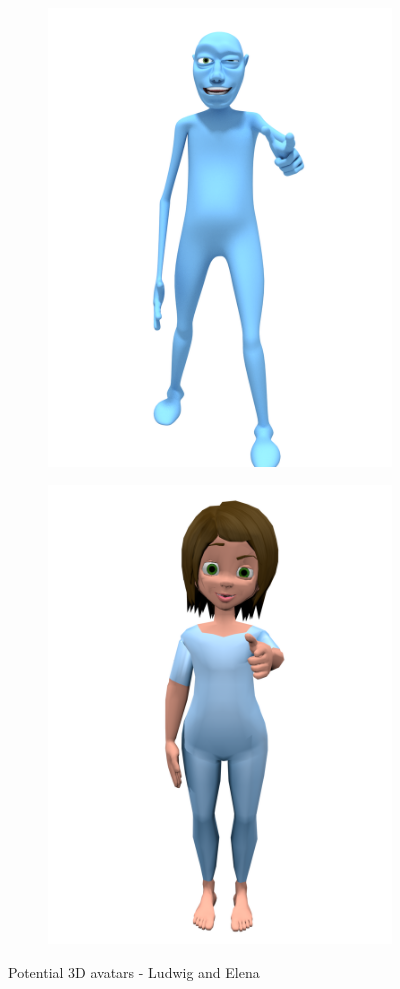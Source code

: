 \documentclass[12pt]{ociamthesis}  %
\begin{document}
\begin{figure}[H]
\centering
\begin{subfigure}[b]{.5\textwidth}
	\captionsetup{width=0.8\textwidth}
  \centering
  \includegraphics[width=0.8\linewidth]{chapter4/ludwig}
  \caption{}
  \label{fig:ludwig}
\end{subfigure}%
\begin{subfigure}[b]{.5\textwidth}
 \captionsetup{width=0.8\textwidth}
  \centering
  \includegraphics[width=0.8\linewidth]{chapter4/girl}
  \caption{}
  \label{fig:elena}
\end{subfigure}
\caption{Potential 3D avatars - Ludwig and Elena}
\label{fig:models}
\end{figure}
\end{document}
